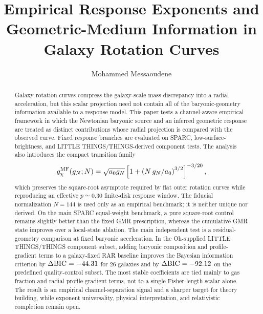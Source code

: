 ﻿\documentclass[twocolumn]{aastex631}
\begin{document}
\pagestyle{plain}
\sloppy
{}

\title{Empirical Response Exponents and Geometric-Medium Information in Galaxy Rotation Curves}
\author[0009-0007-4665-2548]{Mohammed Messaoudene}

\begin{abstract}
Galaxy rotation curves compress the galaxy-scale mass discrepancy into a radial acceleration, but this scalar projection need not contain all of the baryonic-geometry information available to a response model.  This paper tests a channel-aware empirical framework in which the Newtonian baryonic source and an inferred geometric response are treated as distinct contributions whose radial projection is compared with the observed curve.  Fixed response branches are evaluated on SPARC, low-surface-brightness, and LITTLE THINGS/THINGS-derived component tests.  The analysis also introduces the compact transition family
\begin{equation*}
g_\chi^{\rm MF}(g_N;N)=\sqrt{a_0g_N}\left[1+\left(N\,g_N/a_0\right)^{3/2}\right]^{-3/20},
\end{equation*}
which preserves the square-root asymptote required by flat outer rotation curves while reproducing an effective $p\simeq0.30$ finite-disk response window.  The fiducial normalization $N=144$ is used only as an empirical benchmark; it is neither unique nor derived.  On the main SPARC equal-weight benchmark, a pure square-root control remains slightly better than the fixed GMR prescription, whereas the cumulative GMR state improves over a local-state ablation.  The main independent test is a residual-geometry comparison at fixed baryonic acceleration.  In the Oh-supplied LITTLE THINGS/THINGS component subset, adding baryonic composition and profile-gradient terms to a galaxy-fixed RAR baseline improves the Bayesian information criterion by $\Delta{\rm BIC}=-44.31$ for 26 galaxies and by $\Delta{\rm BIC}=-92.12$ on the predefined quality-control subset.  The most stable coefficients are tied mainly to gas fraction and radial profile-gradient terms, not to a single Fisher-length scalar alone.  The result is an empirical channel-separation signal and a sharper target for theory building, while exponent universality, physical interpretation, and relativistic completion remain open.
\end{abstract}
\end{document}
